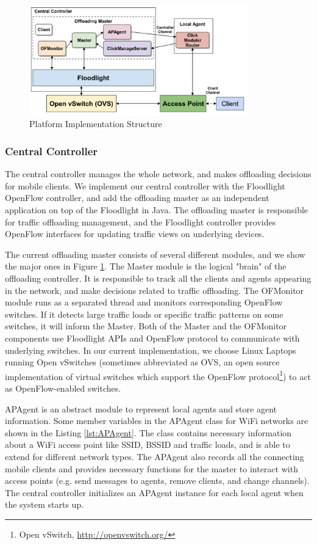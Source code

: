 \documentclass[english]{tktltiki}
\begin{document}
\begin{figure}[htbp]
  \centering
  \includegraphics[width=0.85\textwidth]{images/structure.png}
  \caption{Platform Implementation Structure}
  \label{fig:structure}
\end{figure}

\subsubsection{Central Controller}

The central controller manages the whole network, and makes offloading decisions for mobile clients. We implement our central controller with the Floodlight OpenFlow controller, and add the offloading master as an independent application on top of the Floodlight in Java. The offloading master is responsible for traffic offloading management, and the Floodlight controller provides OpenFlow interfaces for updating traffic views on underlying devices.

The current offloading master consists of several different modules, and we show the major ones in Figure \ref{fig:structure}. The Master module is the logical "brain" of the offloading controller. It is responsible to track all the clients and agents appearing in the network, and make decisions related to traffic offloading. The OFMonitor module runs as a separated thread and monitors corresponding OpenFlow switches. If it detects large traffic loads or specific traffic patterns on some switches, it will inform the Master. Both of the Master and the OFMonitor components use Floodlight APIs and OpenFlow protocol to communicate with underlying switches. 
In our current implementation, we choose Linux Laptops running Open vSwitches (sometimes abbreviated as OVS, an open source implementation of virtual switches which support the OpenFlow protocol\footnote[11]{Open vSwitch, \url{http://openvswitch.org/}}) to act as OpenFlow-enabled switches. 

APAgent is an abstract module to represent local agents and store agent information. Some member variables in the APAgent class for WiFi networks are shown in the Listing \ref{lst:APAgent}. The class contains necessary information about a WiFi access point like SSID, BSSID and traffic loads, and is able to extend for different network types. The APAgent also records all the connecting mobile clients and provides necessary functions for the master to interact with access points (e.g. send messages to agents, remove clients, and change channels). The central controller initializes an APAgent instance for each local agent when the system starts up.
\end{document}
